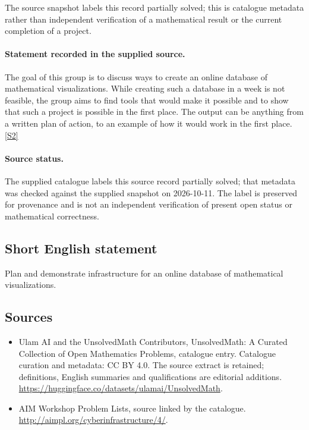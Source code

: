 \documentclass[11pt]{article}
\begin{document}
The source snapshot labels this record partially solved; this is catalogue metadata rather than independent verification of a mathematical result or the current completion of a project.
\paragraph{Statement recorded in the supplied source.}
The goal of this group is to discuss ways to create an online database of mathematical visualizations. While creating such a database in a week is not feasible, the group aims to find tools that would make it possible and to show that such a project is possible in the first place. The output can be anything from a written plan of action, to an example of how it would work in the first place. \href{http://aimpl.org/cyberinfrastructure/4/}{[S2]}
\paragraph{Source status.}
The supplied catalogue labels this source record partially solved; that metadata was checked against the supplied snapshot on 2026-10-11. The label is preserved for provenance and is not an independent verification of present open status or mathematical correctness.
\subsection{Short English statement}
Plan and demonstrate infrastructure for an online database of mathematical visualizations.
\subsection{Sources}
\begin{itemize}
\item[S1] Ulam AI and the UnsolvedMath Contributors, UnsolvedMath: A Curated Collection of Open Mathematics Problems, catalogue entry. Catalogue curation and metadata: CC BY 4.0. The source extract is retained; definitions, English summaries and qualifications are editorial additions.
\url{https://huggingface.co/datasets/ulamai/UnsolvedMath}.
\item[S2] AIM Workshop Problem Lists, source linked by the catalogue.
\url{http://aimpl.org/cyberinfrastructure/4/}.
\end{itemize}
\end{document}

